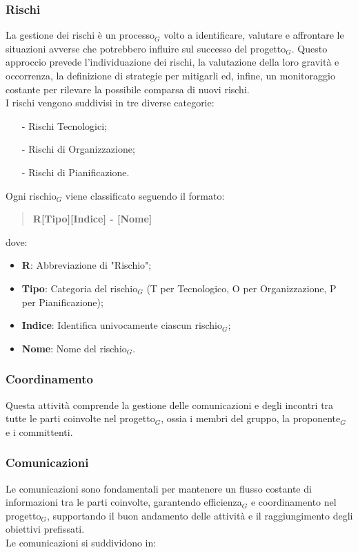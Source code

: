 \documentclass[10pt]{article}
\begin{document}
\begin{justify}
    \subsubsection{Rischi}
    La gestione dei rischi è un processo$_G$ volto a identificare, valutare e affrontare le situazioni avverse che potrebbero influire sul successo del progetto$_G$. Questo approccio prevede l'individuazione dei rischi, la valutazione della loro gravità e occorrenza, la definizione di strategie per mitigarli ed, infine, un monitoraggio costante per rilevare la possibile comparsa di nuovi rischi.\\
    I rischi vengono suddivisi in tre diverse categorie:
    \begin{itemize}
        \item [-] Rischi Tecnologici;
        \item [-] Rischi di Organizzazione;
        \item [-] Rischi di Pianificazione.
    \end{itemize}
    Ogni rischio$_G$ viene classificato seguendo il formato:
    \begin{quote}
         \textbf{R[Tipo][Indice] - [Nome]}
    \end{quote}
    dove:
    \begin{itemize}
        \item \textbf{R}: Abbreviazione di "Rischio";
        \item \textbf{Tipo}: Categoria del rischio$_G$ (T per Tecnologico, O per Organizzazione, P per Pianificazione);
        \item \textbf{Indice}: Identifica univocamente ciascun rischio$_G$;
        \item \textbf{Nome}: Nome del rischio$_G$.
    \end{itemize}

    \subsubsection{Coordinamento}
    Questa attività comprende la gestione delle comunicazioni e degli incontri tra tutte le parti coinvolte nel progetto$_G$, ossia i  membri del gruppo, la proponente$_G$ e i committenti.

    \subsubsection{Comunicazioni}
    Le comunicazioni sono fondamentali per mantenere un flusso costante di informazioni tra le parti coinvolte, garantendo efficienza$_G$ e coordinamento nel progetto$_G$, supportando il buon andamento delle attività e il raggiungimento degli obiettivi prefissati.\\
    Le comunicazioni si suddividono in:


\end{justify}
\end{document}
